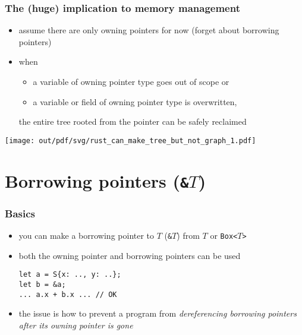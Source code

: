 \documentclass[12pt,dvipdfmx]{beamer}
\newcommand{\aka}[1]{{\color{red}#1}}
\begin{document}
\begin{frame}
  \frametitle{The (huge) implication to memory management}
  \begin{itemize}
  \item assume there are only owning pointers for now (forget about
    borrowing pointers)
  \item when
    \begin{itemize}
    \item a variable of owning pointer type goes out of scope or
    \item a variable or field of owning pointer type is overwritten,
    \end{itemize}
    the entire tree rooted from the pointer can be safely reclaimed
  \end{itemize}
  \begin{center}
    \texttt{[image: out/pdf/svg/rust\_can\_make\_tree\_but\_not\_graph\_1.pdf]}
  \end{center}
\end{frame}



  \iffalse
\begin{frame}[fragile]
  \frametitle{A (huge) implication of the single-owner rule (2)}
  \begin{itemize}
  \item with only owning pointers, {\it no two names in scope
      ever refer to the same object} ({\it no aliasing})
    
  \item {\tt a} and {\tt b} below {\it never} refer to the same object
    \begin{lstlisting}
fn take_two(a : Box<@$T$@>, b : Box<@$T$@>) {
  ...
}        
\end{lstlisting}

\item a boon for the compiler
\item a useful property to avoid mistakes, too
\end{itemize}
\end{frame}
\fi

\section{Borrowing pointers ({\tt \&$T$})}
\begin{frame}[fragile]
  \frametitle{Basics}
  \begin{itemize}
  \item you can make a borrowing pointer to $T$ ({\tt \&$T$})
    from $T$ or {\tt Box<$T$>}
  \item both the owning pointer and borrowing pointers can be used
\begin{lstlisting}
let a = S{x: .., y: ..};
let b = &a;
... a.x + b.x ... // OK
\end{lstlisting}
\item the issue is how to prevent a program
  from \aka{\it dereferencing borrowing pointers
    after its owning pointer is gone}
  \end{itemize}
\end{frame}
\end{document}
